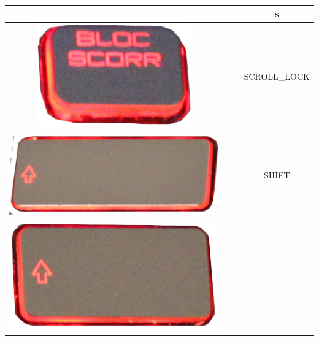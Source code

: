 \begin{longtable}{cccc}
\begin{minipage}[c]{.3\textwidth}
\vspace{0.2cm}
\end{minipage} & & & s\\
\hline
\begin{minipage}[c]{.3\textwidth}
\vspace{0.2cm}
\includegraphics[scale=0.1]{Images/KeyMapping/SCROLL_LOCK}
\vspace{0.2cm}
\end{minipage} & & & SCROLL\_LOCK\\
\hline
\begin{minipage}[c]{.3\textwidth}
\vspace{0.2cm}
\includegraphics[scale=0.1]{Images/KeyMapping/SHIFT}
\vspace{0.2cm}
\end{minipage} & & & SHIFT\\
\hline
\begin{minipage}[c]{.3\textwidth}
\vspace{0.2cm}
\includegraphics[scale=0.1]{Images/KeyMapping/SHIFT_R}

\end{minipage}
\end{longtable}
